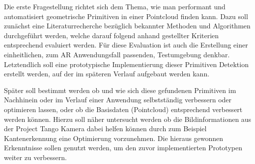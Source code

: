 Die erste Fragestellung richtet sich dem Thema, wie man performant und automatisiert geometrische Primitiven in einer Pointcloud finden kann. Dazu soll zunächst eine Literaturrecherche bezüglich bekannter Methoden und Algorithmen durchgeführt werden, welche darauf folgend anhand gestellter Kriterien entsprechend evaluiert werden. Für diese Evaluation ist auch die Erstellung einer einheitlichen, zum AR Anwendungsfall passenden, Testumgebung denkbar. Letztendlich soll eine prototypische Implementierung dieser Primitiven Detektion erstellt werden, auf der im späteren Verlauf aufgebaut werden kann.

Später soll bestimmt werden ob und wie sich diese gefundenen Primitiven im Nachhinein oder im Verlauf einer Anwendung selbstständig verbessern oder optimieren lassen, oder ob die Basisdaten (Pointcloud) entsprechend verbessert werden können. Hierzu soll näher untersucht werden ob die Bildinformationen aus der Project Tango Kamera dabei helfen können durch zum Beispiel Kantenerkennung eine Optimierung vorzunehmen. Die hieraus gewonnen Erkenntnisse sollen genutzt werden, um den zuvor implementierten Prototypen weiter zu verbessern.